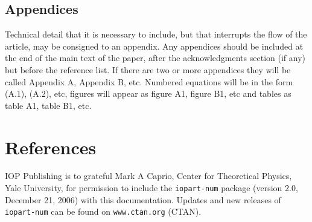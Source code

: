 \documentclass[a4paper]{jpconf}
\begin{document}
\subsection{Appendices}
Technical detail that it is necessary to include, but that interrupts 
the flow of the article, may be consigned to an appendix. 
Any appendices should be included at the end of the main text of the paper, after the acknowledgments section (if any) but before the reference list.
If there are two or more appendices they will be called Appendix A, Appendix B, etc. 
Numbered equations will be in the form (A.1), (A.2), etc,
figures will appear as figure A1, figure B1, etc and tables as table A1,
table B1, etc.

\section*{References}
\begin{thebibliography}{9}
 IOP Publishing is to grateful Mark A Caprio, Center for Theoretical Physics, Yale University, for permission to include the {\tt iopart-num} \BibTeX package (version 2.0, December 21, 2006) with  this documentation. Updates and new releases of {\tt iopart-num} can be found on \verb"www.ctan.org" (CTAN). 
\end{thebibliography}
\end{document}

